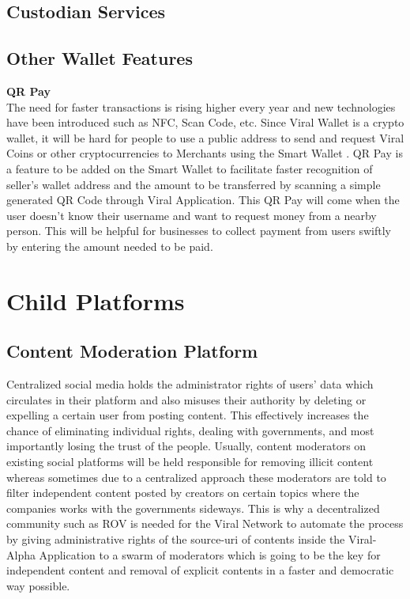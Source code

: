 \documentclass[10pt]{article}
\begin{document}
\subsection{Custodian Services}

\subsection{Other Wallet Features}

\textbf{QR Pay}\\

The need for faster transactions is rising higher every year and new technologies have been introduced such as NFC, Scan Code, etc. Since Viral Wallet is a crypto wallet, it will be hard for people to use a public address to send and request Viral Coins or other cryptocurrencies to Merchants using the Smart Wallet . QR Pay is a feature to be added on the Smart Wallet to facilitate faster recognition of seller’s wallet address and the amount to be transferred by scanning a simple generated QR Code through Viral Application. This QR Pay will come when the user doesn’t know their username and want to request money from a nearby person. This will be helpful for businesses to collect payment from users swiftly by entering the amount needed to be paid.\\

\section{Child Platforms}

\subsection{Content Moderation Platform}

Centralized social media holds the administrator rights of users’ data which circulates in their platform and also misuses their authority by deleting or expelling a certain user from posting content. This effectively increases the chance of eliminating individual rights, dealing with governments, and most importantly losing the trust of the people. Usually, content moderators on existing social platforms will be held responsible for removing illicit content whereas sometimes due to a centralized approach these moderators are told to filter independent content posted by creators on certain topics where the companies works with the governments sideways. This is why a decentralized community such as ROV is needed for the Viral Network to automate the process by giving administrative rights of the source-uri of contents inside the Viral-Alpha Application to a swarm of moderators which is going to be the key for independent content and removal of explicit contents in a faster and democratic way possible.\\
\end{document}
